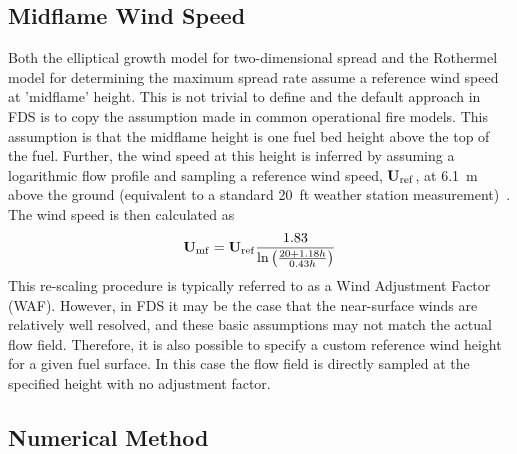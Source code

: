 \subsection{Midflame Wind Speed}

Both the elliptical growth model for two-dimensional spread and the Rothermel model for determining the maximum spread rate assume a reference wind speed at 'midflame' height. This is not trivial to define and the default approach in FDS is to copy the assumption made in common operational fire models. This assumption is that the midflame height is one fuel bed height above the top of the fuel. Further, the wind speed at this height is inferred by assuming a logarithmic flow profile and sampling a reference wind speed, $\mathbf{U}_{\rm ref}$, at 6.1~m above the ground (equivalent to a standard 20~ft weather station measurement)~\cite{Andrews:2012}. The wind speed is then calculated as
\begin{equation}
\mathbf{U}_{\rm mf}=\mathbf{U}_{\rm ref} \frac{1.83}{\ln \left(\frac{20+1.18 h}{0.43 h}\right)}
\end{equation}
This re-scaling procedure is typically referred to as a Wind Adjustment Factor (WAF). However, in FDS it may be the case that the near-surface winds are relatively well resolved, and these basic assumptions may not match the actual flow field. Therefore, it is also possible to specify a custom reference wind height for a given fuel surface. In this case the flow field is directly sampled at the specified height with no adjustment factor.

\subsection{Numerical Method}

